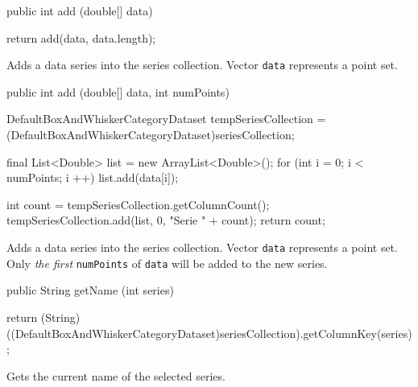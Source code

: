 \begin{code}

   public int add (double[] data) \begin{hide} {
      return add(data, data.length);
   }\end{hide}
\end{code}
\begin{tabb}
   Adds a data series into the series collection. Vector \texttt{data} represents
   a point set.
\end{tabb}
\begin{htmlonly}
\end{htmlonly}
\begin{code}

   public int add (double[] data, int numPoints) \begin{hide} {
      DefaultBoxAndWhiskerCategoryDataset tempSeriesCollection =
            (DefaultBoxAndWhiskerCategoryDataset)seriesCollection;

      final List<Double> list = new ArrayList<Double>();
      for (int i = 0; i < numPoints; i ++)
         list.add(data[i]);

      int count = tempSeriesCollection.getColumnCount();
      tempSeriesCollection.add(list, 0, "Serie " + count);
      return count;
   }\end{hide}
\end{code}
\begin{tabb}
   Adds a data series into the series collection. Vector \texttt{data} represents
   a point set. Only \emph{the first} \texttt{numPoints} of 
   \texttt{data} will be added to the new series.
\end{tabb}
\begin{htmlonly}
\end{htmlonly}
\begin{code}

   public String getName (int series) \begin{hide} {
      return (String)((DefaultBoxAndWhiskerCategoryDataset)seriesCollection).getColumnKey(series);
   }\end{hide}
\end{code}
\begin{tabb}
   Gets the current name of the selected series.
\end{tabb}
